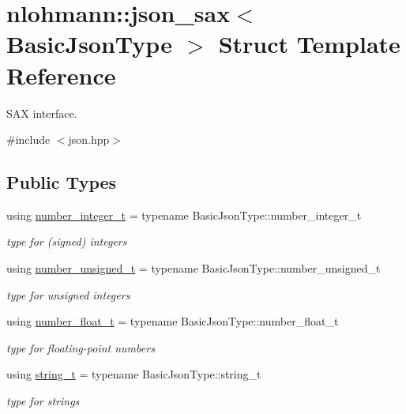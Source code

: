 \hypertarget{structnlohmann_1_1json__sax}{}\section{nlohmann\+::json\+\_\+sax$<$ Basic\+Json\+Type $>$ Struct Template Reference}
\label{structnlohmann_1_1json__sax}


S\+AX interface.  




{\ttfamily \#include $<$json.\+hpp$>$}

\subsection*{Public Types}
\begin{DoxyCompactItemize}
\item 
using \mbox{\hyperlink{structnlohmann_1_1json__sax_a0cef30121f02b7fee85e9708148ea0aa}{number\+\_\+integer\+\_\+t}} = typename Basic\+Json\+Type\+::number\+\_\+integer\+\_\+t
\begin{DoxyCompactList}\small\item\em type for (signed) integers \end{DoxyCompactList}\item 
using \mbox{\hyperlink{structnlohmann_1_1json__sax_a32028cc056ae0f43aaae331cdbbbf856}{number\+\_\+unsigned\+\_\+t}} = typename Basic\+Json\+Type\+::number\+\_\+unsigned\+\_\+t
\begin{DoxyCompactList}\small\item\em type for unsigned integers \end{DoxyCompactList}\item 
using \mbox{\hyperlink{structnlohmann_1_1json__sax_a390c209bffd8c4800c8f3076dc465a20}{number\+\_\+float\+\_\+t}} = typename Basic\+Json\+Type\+::number\+\_\+float\+\_\+t
\begin{DoxyCompactList}\small\item\em type for floating-\/point numbers \end{DoxyCompactList}\item 
using \mbox{\hyperlink{structnlohmann_1_1json__sax_ae01977a9f3c5b3667b7a2929ed91061e}{string\+\_\+t}} = typename Basic\+Json\+Type\+::string\+\_\+t
\begin{DoxyCompactList}\small\item\em type for strings \end{DoxyCompactList}\end{DoxyCompactItemize}
